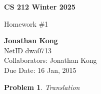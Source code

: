 \documentclass[12pt]{article}
\newtheorem{problem}{Problem}
\begin{document}
\begin{titlepage}
   \begin{center}
       \vspace*{9cm}

       \textbf{CS 212 Winter 2025}

       \vspace{0.5cm}
        Homework \#1
            
        \vfill

       \textbf{Jonathan Kong}\\
       NetID dwa0713\\
       Collaborators: Jonathan Kong\\             
       Due Date: 16 Jan, 2015
            
   \end{center}
\end{titlepage}

\pagebreak

\begin{problem}
Translation 
\end{problem}
\end{document}
